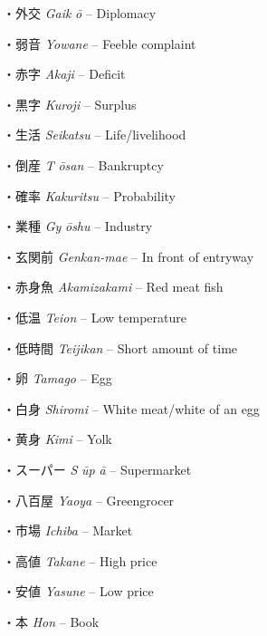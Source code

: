 \par{・外交 \emph{Gaik }\emph{ō }– Diplomacy }
 
\par{・弱音 \emph{Yowane }– Feeble complaint }
 
\par{・赤字 \emph{Akaji }– Deficit }
 
\par{・黒字 \emph{Kuroji }– Surplus }
 
\par{・生活 \emph{Seikatsu }– Life\slash livelihood }
 
\par{・倒産 \emph{T }\emph{ōsan }– Bankruptcy }
 
\par{・確率 \emph{Kakuritsu }– Probability }
 
\par{・業種 \emph{Gy }\emph{ōshu }– Industry }
 
\par{・玄関前 \emph{Genkan-mae }– In front of entryway }
 
\par{・赤身魚 \emph{Akamizakami }– Red meat fish }
 
\par{・低温 \emph{Teion }– Low temperature }
 
\par{・低時間 \emph{Teijikan }– Short amount of time }
 
\par{・卵 \emph{Tamago }– Egg }
 
\par{・白身 \emph{Shiromi }– White meat\slash white of an egg }
 
\par{・黄身 \emph{Kimi }– Yolk }
 
\par{・スーパー \emph{S }\emph{ūp }\emph{ā }– Supermarket }
 
\par{・八百屋 \emph{Yaoya }– Greengrocer }
 
\par{・市場 \emph{Ichiba }– Market }
 
\par{・高値 \emph{Takane }– High price }
 
\par{・安値 \emph{Yasune }– Low price }
 
\par{・本 \emph{Hon }– Book }
 
